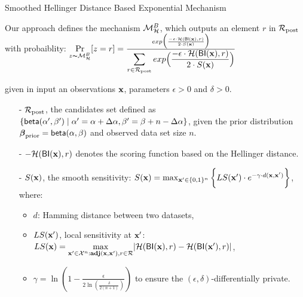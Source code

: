 \documentclass[final,hyperref={pdfpagelabels=false}]{beamer}
\begin{document}
\begin{frame}[t]
\begin{columns}[t]
\begin{column}{.485\textwidth}


\begin{block}{Smoothed Hellinger Distance Based Exponential Mechanism}

Our approach defines the mechanism $\mathcal{M}^{B}_{\mathcal{H}}$, which outputs  an element $r$ in $\mathcal{R}_{\textup{post}}$ with probaiblity:
$
\underset{z \thicksim \mathcal{M}^{B}_{\mathcal{H}}}{\Pr}[z=r] = 
\frac 
{exp\Big(\frac{-\epsilon\cdot\mathcal{H}(\mathsf{BI}(\textbf{x}),r)}{2\cdot S(\textbf{x})}\Big)}
{\displaystyle\sum_{r\in\mathcal{R}_{\textup{post}}} exp\Big(\frac{-\epsilon\cdot\mathcal{H}(\mathsf{BI}(\textbf{x}),r)}{2\cdot S(\textbf{x})}\Big)}
$

given in input an observations $\textbf{x}$, parameters $\epsilon>0$ and $\delta>0$.

\begin{itemize}
  \item[-] $\mathcal{R}_{\textup{post}}$, the candidates set defined as $\{\mathsf{beta}(\alpha',\beta')\mid \alpha'=\alpha+\Delta\alpha, \beta'=\beta+n-\Delta\alpha\}$, given the prior distribution $\boldsymbol{\beta}_{\textup{prior}}=\mathsf{beta}(\alpha, \beta)$ and observed data set size $n$.

  \item[-] $-\mathcal{H}(\mathsf{BI}(\textbf{x}),r)$ denotes the scoring function based on the Hellinger distance.

  \item[-] $S(\textbf{x})$, the smooth sensitivity:
  $
  S(\textbf{x})=\max_{\textbf{x}' \in \{0,1\}^{n}}\bigg \{LS(\textbf{x}') \cdot e^{-\gamma\cdot d(\textbf{x},\textbf{x}')}\bigg\}
  $,
  where:
  \begin{itemize}
   \item $d$: Hamming distance between two datasets, 

   \item $LS(\textbf{x}')$, local sensitivity at $\textbf{x}'$:
   $
   LS(\textbf{x})=\max\limits_{\textbf{x}' \in \mathcal{X}^n:\textbf{adj}(\textbf{x},\textbf{x}'), r\in \mathcal{R}}\lvert \mathcal{H}(\mathsf{BI}(\textbf{x}), r) - \mathcal{H}(\mathsf{BI}(\textbf{x}'), r)\rvert
   $,

   \item $\gamma =   \ln(1 - \frac{\epsilon}{2 \ln (\frac{\delta}{2 (n + 1)})})$ to ensure the $(\epsilon,\delta)$-differentially private.
 \end{itemize}
\end{itemize}


\end{block}



\end{column}
\end{columns}
\end{frame}
\end{document}
